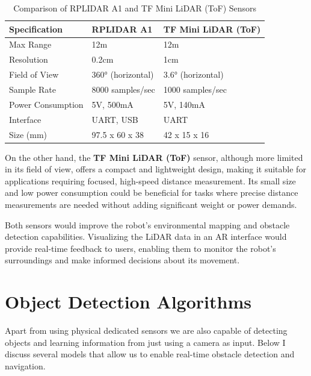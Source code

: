 \begin{table}[htpb]
\centering
\caption{Comparison of RPLIDAR A1 and TF Mini LiDAR (ToF) Sensors}
\label{tab:lidar_comparison}
\begin{tabular}{|l|l|l|} 
\hline
\textbf{Specification} & \textbf{RPLIDAR A1} & \textbf{TF Mini LiDAR (ToF)}  \\ 
\hline
Max Range              & 12m                 & 12m                           \\ 
\hline
Resolution             & 0.2cm               & 1cm                           \\ 
\hline
Field of View          & 360° (horizontal)   & 3.6° (horizontal)             \\ 
\hline
Sample Rate            & 8000 samples/sec    & 1000 samples/sec              \\ 
\hline
Power Consumption      & 5V, 500mA           & 5V, 140mA                     \\ 
\hline
Interface              & UART, USB           & UART                          \\ 
\hline
Size (mm)              & 97.5 x 60 x 38      & 42 x 15 x 16                  \\
\hline
\end{tabular}
\end{table}

On the other hand, the \textbf{TF Mini LiDAR (ToF)} sensor, although more limited in its field of view, offers a compact and lightweight design, making it suitable for applications requiring focused, high-speed distance measurement. Its small size and low power consumption could be beneficial for tasks where precise distance measurements are needed without adding significant weight or power demands.

Both sensors would improve the robot's environmental mapping and obstacle detection capabilities. Visualizing the LiDAR data in an AR interface would provide real-time feedback to users, enabling them to monitor the robot’s surroundings and make informed decisions about its movement.

\section{Object Detection Algorithms}

Apart from using physical dedicated sensors we are also capable of detecting objects and learning information from just using a camera as input. Below I discuss several models that allow us to enable real-time obstacle detection and navigation.


